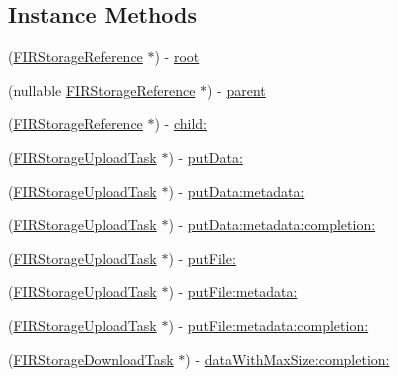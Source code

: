 \subsection*{Instance Methods}
\begin{DoxyCompactItemize}
\item 
(\hyperlink{interface_f_i_r_storage_reference}{F\+I\+R\+Storage\+Reference} $\ast$) -\/ \hyperlink{interface_f_i_r_storage_reference_ab91e075c2fed2ddb7d2a89d687f47030}{root}
\item 
(nullable \hyperlink{interface_f_i_r_storage_reference}{F\+I\+R\+Storage\+Reference} $\ast$) -\/ \hyperlink{interface_f_i_r_storage_reference_ac7de04d6b32a64efd29d23806dd7483a}{parent}
\item 
(\hyperlink{interface_f_i_r_storage_reference}{F\+I\+R\+Storage\+Reference} $\ast$) -\/ \hyperlink{interface_f_i_r_storage_reference_a241599e06c2e0fa37d6fcfdfac61f4d8}{child\+:}
\item 
(\hyperlink{interface_f_i_r_storage_upload_task}{F\+I\+R\+Storage\+Upload\+Task} $\ast$) -\/ \hyperlink{interface_f_i_r_storage_reference_a88415944d46afc28a8734e8cbab86740}{put\+Data\+:}
\item 
(\hyperlink{interface_f_i_r_storage_upload_task}{F\+I\+R\+Storage\+Upload\+Task} $\ast$) -\/ \hyperlink{interface_f_i_r_storage_reference_ae837031a280e56ea1ba5d18f0b84c0a3}{put\+Data\+:metadata\+:}
\item 
(\hyperlink{interface_f_i_r_storage_upload_task}{F\+I\+R\+Storage\+Upload\+Task} $\ast$) -\/ \hyperlink{interface_f_i_r_storage_reference_a3051f828285982f425c6b9f72e8caa2c}{put\+Data\+:metadata\+:completion\+:}
\item 
(\hyperlink{interface_f_i_r_storage_upload_task}{F\+I\+R\+Storage\+Upload\+Task} $\ast$) -\/ \hyperlink{interface_f_i_r_storage_reference_aa24045fbea599fbbe7832a81761b1e8c}{put\+File\+:}
\item 
(\hyperlink{interface_f_i_r_storage_upload_task}{F\+I\+R\+Storage\+Upload\+Task} $\ast$) -\/ \hyperlink{interface_f_i_r_storage_reference_af27be33e866ddae25939b2c4acb28f3b}{put\+File\+:metadata\+:}
\item 
(\hyperlink{interface_f_i_r_storage_upload_task}{F\+I\+R\+Storage\+Upload\+Task} $\ast$) -\/ \hyperlink{interface_f_i_r_storage_reference_a488f02ce93fed03e4ceb53e2e4cbd499}{put\+File\+:metadata\+:completion\+:}
\item 
(\hyperlink{interface_f_i_r_storage_download_task}{F\+I\+R\+Storage\+Download\+Task} $\ast$) -\/ \hyperlink{interface_f_i_r_storage_reference_ac9515c9f1e1407727b700fc2462a555b}{data\+With\+Max\+Size\+:completion\+:}

\end{DoxyCompactItemize}

